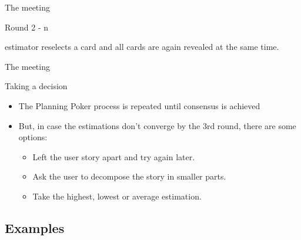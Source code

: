 \documentclass[dvips,11pt,xcolor=dvipsnames]{beamer}
\numberwithin{table}{section}
\numberwithin{figure}{section} %
\begin{document}
\begin{frame}{The meeting}
\begin{block}{Round 2 - n}
\begin{enumerate}
estimator reselects a card and all cards are again revealed at the same time.
    \end{enumerate}    
    
  \end{block}
  
\end{frame}

\begin{frame}{The meeting}
  
  \begin{block}{Taking a decision}
    
    \begin{itemize}
    \item The Planning Poker process is repeated until consensus is achieved 
    \item But, in case the estimations don’t converge by the 3rd round, there are some options:
    \begin{itemize}

    \item Left the user story apart and try again later.
    \item Ask the user to decompose the story in smaller parts.
    \item Take the highest, lowest or average estimation.
    \end{itemize}

    \end{itemize}    
  \end{block}
  
\end{frame}

\subsection{Examples}
\end{document}
